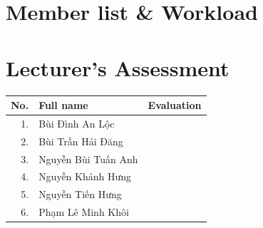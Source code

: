 \section*{Member list \& Workload}

\contribution

\vspace{1cm}%
\section*{Lecturer's Assessment}

\begingroup
    \renewcommand{\arraystretch}{1.5}
    \begin{center}
        \begin{tabularx}{\textwidth}{|r|l|>{\centering\arraybackslash}X|}
            \hline
            \textbf{No.} & \textbf{Full name} & \textbf{Evaluation} \\
            \hline
            \hline
            1. & Bùi Đình An Lộc & \\ \hline
            2. & Bùi Trần Hải Đăng & \\ \hline
            3. & Nguyễn Bùi Tuấn Anh & \\ \hline
            4. & Nguyễn Khánh Hưng & \\ \hline
            5. & Nguyễn Tiến Hưng & \\ \hline
            6. & Phạm Lê Minh Khôi & \\ \hline
        \end{tabularx}
    \end{center}
\endgroup
